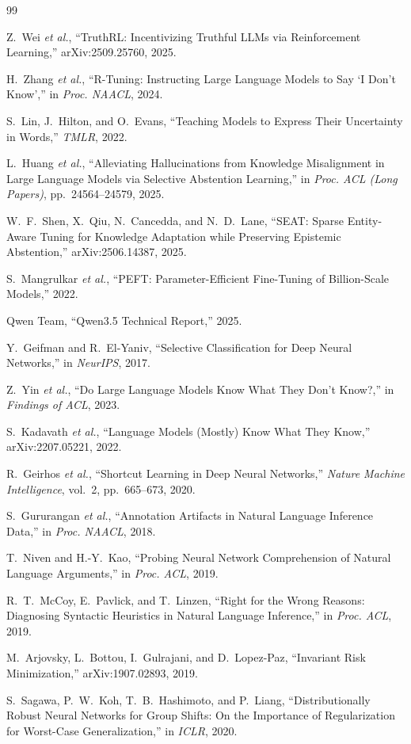 \documentclass[11pt,a4paper]{article}
\begin{document}
\begin{thebibliography}{99}

 Z.~Wei \emph{et al.},
  ``TruthRL: Incentivizing Truthful LLMs via Reinforcement Learning,''
  arXiv:2509.25760, 2025.

 H.~Zhang \emph{et al.},
  ``R-Tuning: Instructing Large Language Models to Say `I Don't Know',''
  in \emph{Proc. NAACL}, 2024.

 S.~Lin, J.~Hilton, and O.~Evans,
  ``Teaching Models to Express Their Uncertainty in Words,''
  \emph{TMLR}, 2022.

 L.~Huang \emph{et al.},
  ``Alleviating Hallucinations from Knowledge Misalignment in Large Language
  Models via Selective Abstention Learning,''
  in \emph{Proc. ACL (Long Papers)}, pp.~24564--24579, 2025.

 W.~F.~Shen, X.~Qiu, N.~Cancedda, and N.~D.~Lane,
  ``SEAT: Sparse Entity-Aware Tuning for Knowledge Adaptation while Preserving
  Epistemic Abstention,'' arXiv:2506.14387, 2025.

 S.~Mangrulkar \emph{et al.},
  ``PEFT: Parameter-Efficient Fine-Tuning of Billion-Scale Models,'' 2022.

 Qwen Team, ``Qwen3.5 Technical Report,'' 2025.

 Y.~Geifman and R.~El-Yaniv,
  ``Selective Classification for Deep Neural Networks,'' in \emph{NeurIPS}, 2017.

 Z.~Yin \emph{et al.},
  ``Do Large Language Models Know What They Don't Know?,''
  in \emph{Findings of ACL}, 2023.

 S.~Kadavath \emph{et al.},
  ``Language Models (Mostly) Know What They Know,'' arXiv:2207.05221, 2022.

 R.~Geirhos \emph{et al.},
  ``Shortcut Learning in Deep Neural Networks,''
  \emph{Nature Machine Intelligence}, vol.~2, pp.~665--673, 2020.

 S.~Gururangan \emph{et al.},
  ``Annotation Artifacts in Natural Language Inference Data,''
  in \emph{Proc. NAACL}, 2018.

 T.~Niven and H.-Y.~Kao,
  ``Probing Neural Network Comprehension of Natural Language Arguments,''
  in \emph{Proc. ACL}, 2019.

 R.~T.~McCoy, E.~Pavlick, and T.~Linzen,
  ``Right for the Wrong Reasons: Diagnosing Syntactic Heuristics in Natural
  Language Inference,'' in \emph{Proc. ACL}, 2019.

 M.~Arjovsky, L.~Bottou, I.~Gulrajani, and D.~Lopez-Paz,
  ``Invariant Risk Minimization,'' arXiv:1907.02893, 2019.

 S.~Sagawa, P.~W.~Koh, T.~B.~Hashimoto, and P.~Liang,
  ``Distributionally Robust Neural Networks for Group Shifts: On the Importance
  of Regularization for Worst-Case Generalization,'' in \emph{ICLR}, 2020.

\end{thebibliography}
\end{document}
